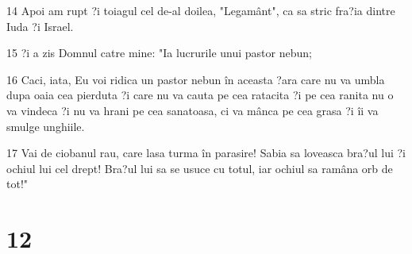 \par 14 Apoi am rupt ?i toiagul cel de-al doilea, "Legamânt", ca sa stric fra?ia dintre Iuda ?i Israel.
\par 15 ?i a zis Domnul catre mine: "Ia lucrurile unui pastor nebun;
\par 16 Caci, iata, Eu voi ridica un pastor nebun în aceasta ?ara care nu va umbla dupa oaia cea pierduta ?i care nu va cauta pe cea ratacita ?i pe cea ranita nu o va vindeca ?i nu va hrani pe cea sanatoasa, ci va mânca pe cea grasa ?i îi va smulge unghiile.
\par 17 Vai de ciobanul rau, care lasa turma în parasire! Sabia sa loveasca bra?ul lui ?i ochiul lui cel drept! Bra?ul lui sa se usuce cu totul, iar ochiul sa ramâna orb de tot!"

\chapter{12}

